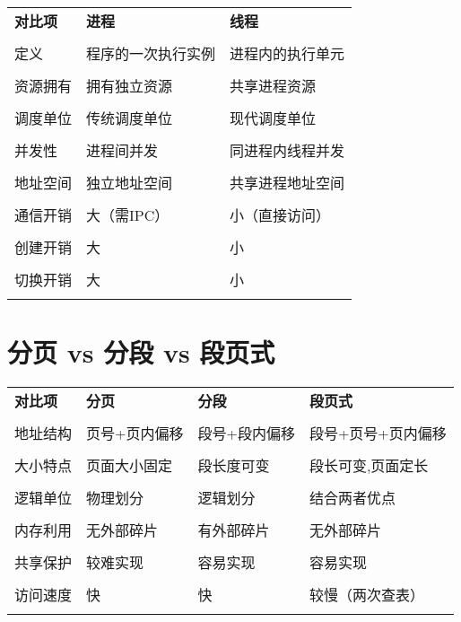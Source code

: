 \documentclass[lang=cn,newtx,10pt,scheme=chinese]{../../elegantbook}
\begin{document}
\begin{longtable}{@{}p{3cm}p{5cm}p{5cm}@{}}
\toprule
\textbf{对比项} & \textbf{进程} & \textbf{线程} \\\\ \midrule
\endhead

定义 & 程序的一次执行实例 & 进程内的执行单元 \\\\
资源拥有 & 拥有独立资源 & 共享进程资源 \\\\
调度单位 & 传统调度单位 & 现代调度单位 \\\\
并发性 & 进程间并发 & 同进程内线程并发 \\\\
地址空间 & 独立地址空间 & 共享进程地址空间 \\\\
通信开销 & 大（需IPC） & 小（直接访问） \\\\
创建开销 & 大 & 小 \\\\
切换开销 & 大 & 小 \\\\

\bottomrule
\end{longtable}

\section{分页 vs 分段 vs 段页式}

\begin{longtable}{@{}p{2.5cm}p{4cm}p{4cm}p{3cm}@{}}
\toprule
\textbf{对比项} & \textbf{分页} & \textbf{分段} & \textbf{段页式} \\\\ \midrule
\endhead

地址结构 & 页号+页内偏移 & 段号+段内偏移 & 段号+页号+页内偏移 \\\\
大小特点 & 页面大小固定 & 段长度可变 & 段长可变,页面定长 \\\\
逻辑单位 & 物理划分 & 逻辑划分 & 结合两者优点 \\\\
内存利用 & 无外部碎片 & 有外部碎片 & 无外部碎片 \\\\
共享保护 & 较难实现 & 容易实现 & 容易实现 \\\\
访问速度 & 快 & 快 & 较慢（两次查表） \\\\

\bottomrule
\end{longtable}
\end{document}
